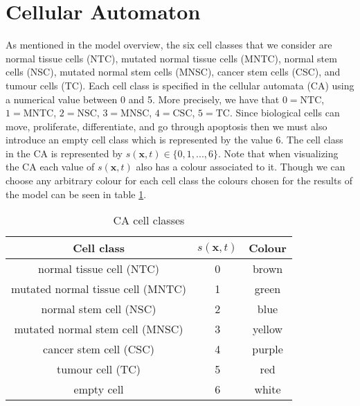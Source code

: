 \documentclass[\main/thesis.tex]{subfiles}
\begin{document}
\section{Cellular Automaton}
As mentioned in the model overview, the six cell classes that we consider are 
normal tissue cells (NTC), mutated normal tissue cells (MNTC), normal stem cells 
(NSC), mutated normal stem cells (MNSC), cancer stem cells (CSC), and tumour 
cells (TC). Each cell class is specified in the cellular automata (CA) using a 
numerical value between 0 and 5. More precisely, we have that \newline
$0 {=} \text{NTC}$, $1 {=} \text{MNTC}$, $2 {=} \text{NSC}$, $3 {=} \text{MNSC}$, $4 {=} \text{CSC}$, $5 {=} \text{TC}$.
Since biological cells can move, proliferate, differentiate, and go through 
apoptosis then we must also introduce an empty cell class which is represented 
by the value 6. The cell class in the CA is represented by 
$s(\boldsymbol{x}, t) {\in} \{ 0, 1, ..., 6  \}$. Note that when visualizing the CA each 
value of $s(\boldsymbol{x}, t)$ also has a colour associated to it. 
Though we can choose any arbitrary colour for each cell class the colours chosen for the 
results of the model can be seen in table \ref{table:CAStates}.
\begin{table}[H]
\centering	
\begin{tabular}{|c|c|c|}
	\hline
	Cell class & $s(\boldsymbol{x}, t)$ & Colour \\
	\hline
	normal tissue cell (NTC) & 0 & \cellcolor[RGB]{146, 111, 98} brown \\
	mutated normal tissue cell (MNTC) & 1 & \cellcolor[RGB]{50, 200, 118} green \\
	normal stem cell (NSC) & 2 & \cellcolor[RGB]{0, 84, 147} blue \\
	mutated normal stem cell (MNSC) & 3 & \cellcolor[RGB]{240, 200, 0} yellow \\
	cancer stem cell (CSC) & 4 & \cellcolor[RGB]{200, 62, 255} purple \\
	tumour cell (TC) & 5 & \cellcolor[RGB]{255, 61, 62} red \\
	empty cell & 6 & \cellcolor[RGB]{255, 255, 255} white \\
	\hline
\end{tabular}
\caption{CA cell classes}
\label{table:CAStates} 
\end{table}
\end{document}
